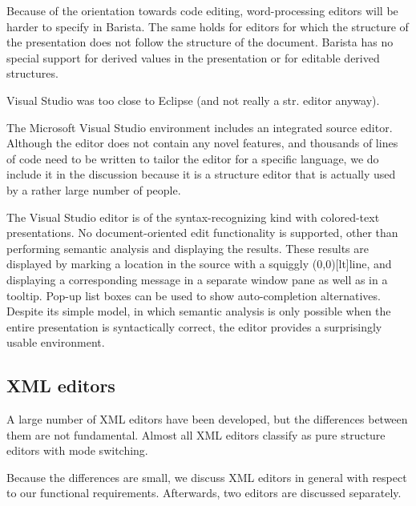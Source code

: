 \documentclass{speauth}
\begin{document}
Because of the orientation towards code editing, word-processing editors will be harder to specify in Barista. The same holds for editors for which the structure of the presentation does not follow the structure of the document. Barista has no special support for derived values in the presentation or for editable derived structures.

\cbend

\bc  Visual Studio was too close to Eclipse (and not really a str. editor anyway).


The Microsoft Visual Studio environment includes an integrated source editor. Although the editor does not contain any novel features, and thousands of lines of code need to be written to tailor the editor for a specific language, we do include it in the discussion because it is a structure editor that is actually used by a rather large number of people. 

The Visual Studio editor is of the syntax-recognizing kind with colored-text presentations. No document-oriented edit functionality is supported, other than performing semantic analysis and displaying the results. These results are displayed by marking a location in the source with a squiggly \makebox(0,0)[lt]{}line, and displaying a corresponding message in a separate window pane as well as in a tooltip. Pop-up list boxes can be used to show auto-completion alternatives. Despite its simple model, in which semantic analysis is only possible when the entire presentation is syntactically correct, the editor provides a surprisingly usable environment. 

\ec

%																
\subsection{XML editors} \label{sect:xmlEditors}

A large number of XML editors have been developed, but the differences between them are not fundamental. Almost all XML editors classify as pure structure editors with mode switching. 

Because the differences are small, we discuss XML editors in general with respect to our functional requirements. Afterwards, two  editors are discussed separately.
\end{document}
